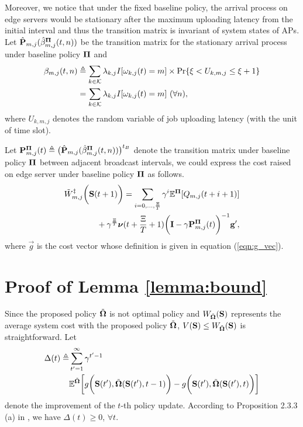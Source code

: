 Moreover, we notice that under the fixed baseline policy, the arrival process on edge servers would be stationary after the maximum uploading latency from the initial interval and thus the transition matrix is invariant of system states of APs.
Let $\hat{\mathbf{P}}_{m,j}(\hat{\beta}^{\boldsymbol{\Pi}}_{m,j}(t,n))$ be the transition matrix for the stationary arrival process under baseline policy $\boldsymbol{\Pi}$ and
{\small
\begin{align}
    \beta_{m,j}(t,n) &\triangleq \sum_{k\in\mathcal{K}} \lambda_{k,j}I[\omega_{k,j}(t)=m] \times \Pr\{ \xi<U_{k,m,j}\le\xi+1 \}
    \nonumber\\
    &= \sum_{k\in\mathcal{K}} \lambda_{k,j}I[\omega_{k,j}(t)=m]\ (\forall n),
\end{align}
}where $U_{k,m,j}$ denotes the random variable of job uploading latency (with the unit of time slot).

Let
$\mathbf{P}^{\boldsymbol{\Pi}}_{m,j}(t) \triangleq \big( \hat{\mathbf{P}}_{m,j}(\hat{\beta}^{\boldsymbol{\Pi}}_{m,j}(t,n)) \big)^{t_B}$
denote the transition matrix under baseline policy $\boldsymbol{\Pi}$ between adjacent broadcast intervals, we could express the cost raised on edge server under baseline policy $\boldsymbol{\Pi}$ as follows.
{\small
\begin{align}
    &\tilde{W}^{\ddagger}_{m,j}\bigg(\mathbf{S}(t+1)\bigg)
    = \sum_{i=0,\dots,\frac{\Xi}{T}} \gamma^{i} \mathbb{E}^{\boldsymbol{\Pi}}[ Q_{m,j}({t+i+1}) ]
    \nonumber\\
    &~~~~~~~~~~~~+ \gamma^{\frac{\Xi}{T}} 
    \boldsymbol{\nu}({t+\frac{\Xi}{T}+1})
    \bigg(
        \mathbf{I} - \gamma \mathbf{P}^{\boldsymbol{\Pi}}_{m,j}(t)
    \bigg)^{-1} \mathbf{g}',
\end{align}   
}
where $\vec{g}$ is the cost vector whose definition is given in equation (\ref{eqn:g_vec}).

\section{ Proof of Lemma \ref{lemma:bound} }
\label{append_3}
Since the proposed policy $\tilde{\boldsymbol{\Omega}}$ is not optimal policy and $W_{\tilde{\boldsymbol{\Omega}}}(\mathbf{S})$ represents the average system cost with the proposed policy $\tilde{\boldsymbol{\Omega}}$, $V(\mathbf{S}) \leq W_{\tilde{\boldsymbol{\Omega}}}(\mathbf{S})$ is straightforward.
Let 
{\small
\begin{align*}
    \Delta(t) \triangleq &
    \sum_{t'=1}^{\infty} \gamma^{t'-1}\\\nonumber
    &\mathbb{E}^{ \tilde{\boldsymbol{\Omega}} } \bigg[
        g\bigg(\mathbf{S}(t'), \tilde{\boldsymbol{\Omega}}(\mathbf{S}(t'),t-1)\bigg)
        -  g\bigg(\mathbf{S}(t'), \tilde{\boldsymbol{\Omega}}(\mathbf{S}(t'),t)\bigg)
    \bigg]
\end{align*}
}%
denote the improvement of the $t$-th policy update.
According to Proposition 2.3.3 (a) in \cite{dp-control}, we have $\Delta(t)\geq 0$, $\forall t$.

